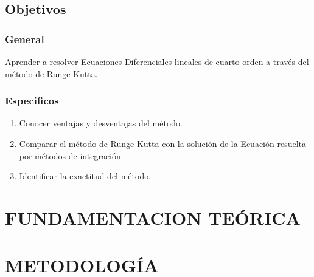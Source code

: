 \documentclass[12pt]{article}
\begin{document}
\subsection{Objetivos}

\subsubsection{General}
Aprender a resolver Ecuaciones Diferenciales lineales de cuarto orden a través del método de Runge-Kutta.
\subsubsection{Especificos}
\begin{enumerate}
	\item Conocer ventajas y desventajas del método.
	\item Comparar el método de Runge-Kutta con la solución de la Ecuación resuelta por métodos de integración.
	\item Identificar la exactitud del método.
\end{enumerate}

\section{FUNDAMENTACION TEÓRICA}

\section{METODOLOGÍA}
\end{document}
